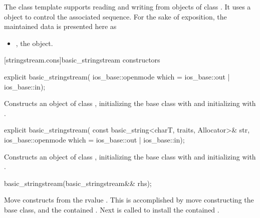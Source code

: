 \pnum
The
class template
supports reading and writing from objects of class
.
It uses a
object to control the associated sequence.
For the sake of exposition, the maintained data is presented here as
\begin{itemize}
\item
{}, the  object.
\end{itemize}

[stringstream.cons]{basic_stringstream constructors}

%
\begin{itemdecl}
explicit basic_stringstream(
  ios_base::openmode which = ios_base::out | ios_base::in);
\end{itemdecl}

\begin{itemdescr}
\pnum
\effects
Constructs an object of class
,
initializing the base class with
and initializing
with
.
\end{itemdescr}

%
\begin{itemdecl}
explicit basic_stringstream(
  const basic_string<charT, traits, Allocator>& str,
  ios_base::openmode which = ios_base::out | ios_base::in);
\end{itemdecl}

\begin{itemdescr}
\pnum
\effects
Constructs an object of class
,
initializing the base class with
and initializing
with
.
\end{itemdescr}

%
\begin{itemdecl}
basic_stringstream(basic_stringstream&& rhs);
\end{itemdecl}

\begin{itemdescr}
\pnum
\effects Move constructs from the rvalue . This
is accomplished by move constructing the base class, and the contained
.
Next  is called to
install the contained .
\end{itemdescr}

